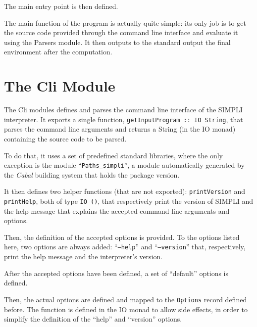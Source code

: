 \documentclass{esposito-documentation}
\begin{document}


The main entry point is then defined. 


The main function of the program is actually quite simple: its only job is to
get the source code provided through the command line interface and evaluate it
using the Parsers module. It then outputs to the standard output the final
environment after the computation.

\section{The Cli Module}



The Cli modules defines and parses the command line interface of the SIMPLI
interpreter. It exports a single function,
\lstinline|getInputProgram :: IO String|, that parses the command line
arguments and returns a String (in the IO monad) containing the source code to
be parsed.

To do that, it uses a set of predefined standard libraries, where the only
exception is the module ``\texttt{Paths_simpli}'', a module automatically
generated by the \emph{Cabal} building system \cite{CabalTeam2020} that holds
the package version.



It then defines two helper functions (that are not exported):
\lstinline|printVersion| and \lstinline|printHelp|, both of type
\lstinline|IO ()|, that respectively print the version of SIMPLI and the help
message that explains the accepted command line arguments and options.



Then, the definition of the accepted options is provided. To the options listed
here, two options are always added: ``\texttt{--help}'' and
``\texttt{--version}'' that, respectively, print the help message and the
interpreter's version.



After the accepted options have been defined, a set of ``default'' options is
defined.



Then, the actual options are defined and mapped to the \lstinline|Options|
record defined before. The function is defined in the IO monad to allow side
effects, in order to simplify the definition of the ``help'' and ``version''
options.
\end{document}
